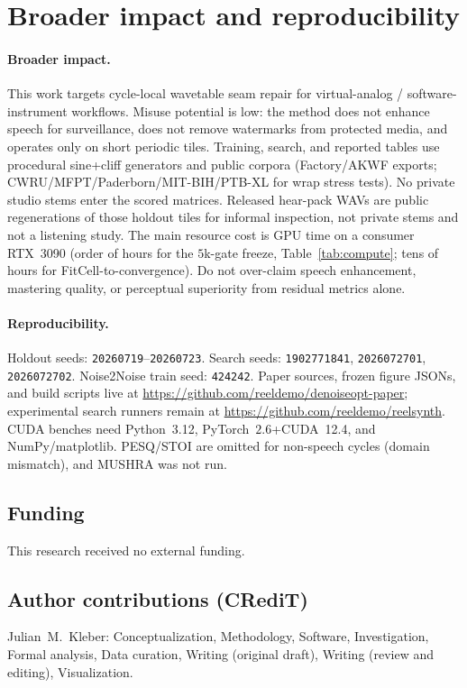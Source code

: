 \section{Broader impact and reproducibility}
\label{sec:ethics}

\paragraph{Broader impact.}
This work targets cycle-local wavetable seam repair for virtual-analog / software-instrument workflows.
Misuse potential is low: the method does not enhance speech for surveillance, does not remove watermarks from protected media, and operates only on short periodic tiles.
Training, search, and reported tables use procedural sine{+}cliff generators and public corpora (Factory/AKWF exports; CWRU/MFPT/Paderborn/MIT-BIH/PTB-XL for wrap stress tests).
No private studio stems enter the scored matrices.
Released hear-pack WAVs are public regenerations of those holdout tiles for informal inspection, not private stems and not a listening study.
The main resource cost is GPU time on a consumer RTX~3090 (order of hours for the $5$k-gate freeze, Table~\ref{tab:compute}; tens of hours for FitCell-to-convergence).
Do not over-claim speech enhancement, mastering quality, or perceptual superiority from residual metrics alone.

\paragraph{Reproducibility.}
Holdout seeds: \texttt{20260719}--\texttt{20260723}.
Search seeds: \texttt{1902771841}, \texttt{2026072701}, \texttt{2026072702}.
Noise2Noise train seed: \texttt{424242}.
Paper sources, frozen figure JSONs, and build scripts live at
\url{https://github.com/reeldemo/denoiseopt-paper};
experimental search runners remain at \url{https://github.com/reeldemo/reelsynth}.
CUDA benches need Python~3.12, PyTorch~$2.6$+CUDA~12.4, and NumPy/matplotlib.
PESQ/STOI are omitted for non-speech cycles (domain mismatch), and MUSHRA was not run.

\subsection{Funding}
\label{sec:funding}
This research received no external funding.

\subsection{Author contributions (CRediT)}
\label{sec:credit}
Julian~M.~Kleber: Conceptualization, Methodology, Software, Investigation, Formal analysis, Data curation, Writing (original draft), Writing (review and editing), Visualization.

